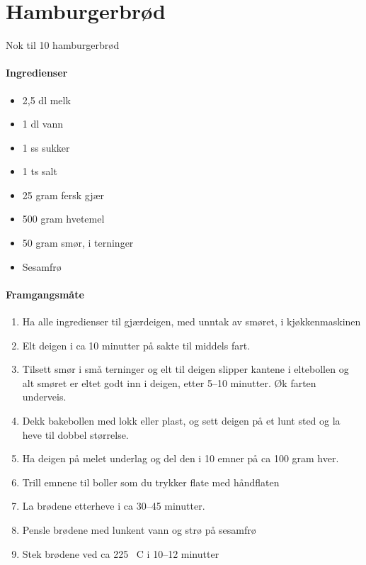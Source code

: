 \section{Hamburgerbrød}
Nok til 10 hamburgerbrød

\paragraph{Ingredienser}
\begin{itemize}[noitemsep]
    \item 2,5 dl melk
    \item 1 dl vann
    \item 1 ss sukker
    \item 1 ts salt
    \item 25 gram fersk gjær
    \item 500 gram hvetemel
    \item 50 gram smør, i terninger
    \item Sesamfrø
\end{itemize}

\paragraph{Framgangsmåte}
\begin{enumerate}[noitemsep]
  \item Ha alle ingredienser til gjærdeigen, med unntak av smøret, i kjøkkenmaskinen
  \item Elt deigen i ca 10 minutter på sakte til middels fart.
  \item Tilsett smør i små terninger og elt til deigen slipper kantene i eltebollen og alt smøret er eltet godt inn i deigen, etter 5--10 minutter. Øk farten underveis.
  \item Dekk bakebollen med lokk eller plast, og sett deigen på et lunt sted og la heve til dobbel størrelse.
  \item Ha deigen på melet underlag og del den i 10 emner på ca 100 gram hver.
  \item Trill emnene til boller som du trykker flate med håndflaten
  \item La brødene etterheve i ca 30--45 minutter.
  \item Pensle brødene med lunkent vann og strø på sesamfrø
  \item Stek brødene ved ca 225 \degree~C i 10--12 minutter
\end{enumerate}
